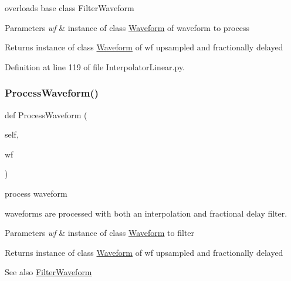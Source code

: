 overloads base class Filter\+Waveform 


\begin{DoxyParams}{Parameters}
{\em wf} & instance of class \hyperlink{namespaceSignalIntegrity_1_1TimeDomain_1_1Waveform}{Waveform} of waveform to process \\
\hline
\end{DoxyParams}
\begin{DoxyReturn}{Returns}
instance of class \hyperlink{namespaceSignalIntegrity_1_1TimeDomain_1_1Waveform}{Waveform} of wf upsampled and fractionally delayed 
\end{DoxyReturn}


Definition at line 119 of file Interpolator\+Linear.\+py.

\mbox{\label{classSignalIntegrity_1_1TimeDomain_1_1Filters_1_1InterpolatorLinear_1_1InterpolatorFractionalDelayFilterLinear_ae09bec195c9cb1d5819e73b7be169b11}} 
\subsubsection{\texorpdfstring{Process\+Waveform()}{ProcessWaveform()}}
{\footnotesize\ttfamily def Process\+Waveform (\begin{DoxyParamCaption}\item[{}]{self,  }\item[{}]{wf }\end{DoxyParamCaption})}



process waveform 

waveforms are processed with both an interpolation and fractional delay filter.


\begin{DoxyParams}{Parameters}
{\em wf} & instance of class \hyperlink{namespaceSignalIntegrity_1_1TimeDomain_1_1Waveform}{Waveform} to filter \\
\hline
\end{DoxyParams}
\begin{DoxyReturn}{Returns}
instance of class \hyperlink{namespaceSignalIntegrity_1_1TimeDomain_1_1Waveform}{Waveform} of wf upsampled and fractionally delayed
\end{DoxyReturn}
\begin{DoxySeeAlso}{See also}
\hyperlink{classSignalIntegrity_1_1TimeDomain_1_1Filters_1_1InterpolatorLinear_1_1InterpolatorFractionalDelayFilterLinear_a84e73c18250ca4a61482f94ad61e735b}{Filter\+Waveform} 
\end{DoxySeeAlso}


